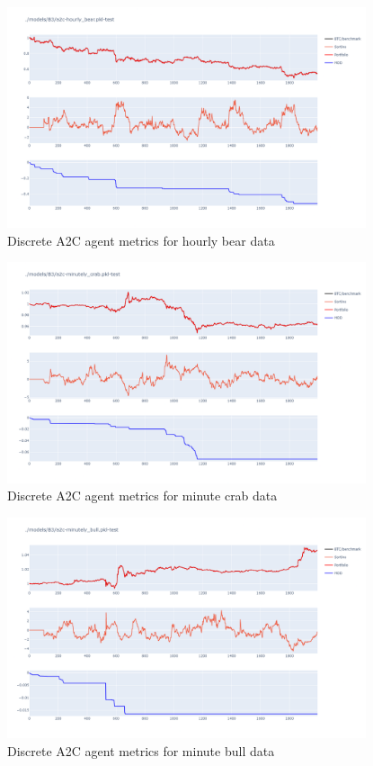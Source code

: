 \begin{figure}[H]
    \centering
    \includegraphics[width=0.94\textwidth]{graphics/testphoto/a2c-disc-hbr.png}
    \caption{Discrete A2C agent metrics for hourly bear data}
    \label{f-a2c-disc-hbr}
\end{figure}

\begin{figure}[H]
    \centering
    \includegraphics[width=0.94\textwidth]{graphics/testphoto/a2c-disc-mcr.png}
    \caption{Discrete A2C agent metrics for minute crab data}
    \label{f-a2c-disc-mcr}
\end{figure}

\begin{figure}[H]
    \centering
    \includegraphics[width=0.94\textwidth]{graphics/testphoto/a2c-disc-mbu.png}
    \caption{Discrete A2C agent metrics for minute bull data}
    \label{f-a2c-disc-mbu}
\end{figure}

